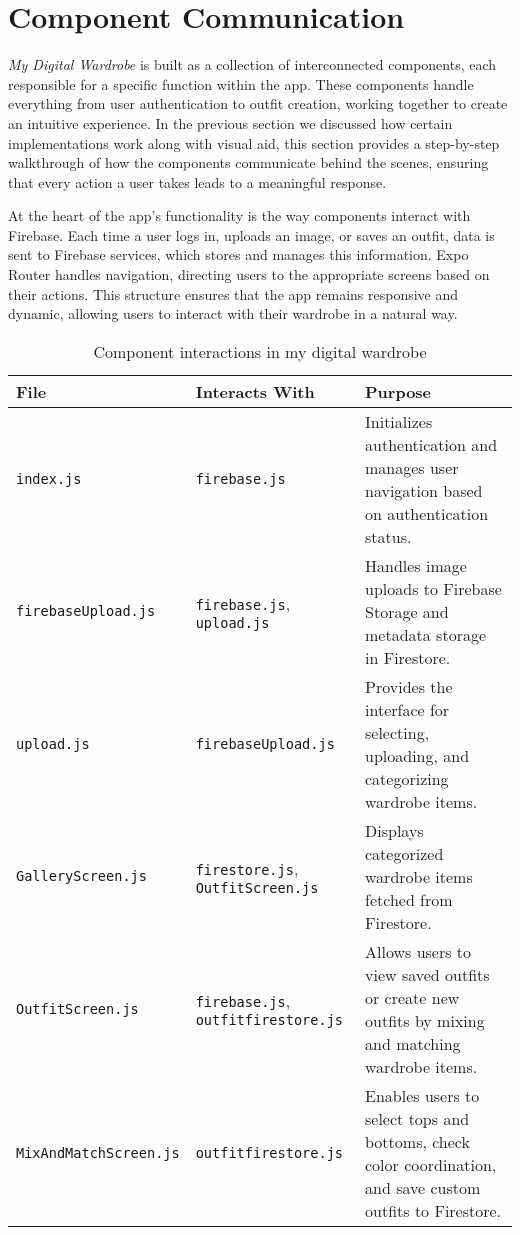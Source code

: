\section{Component Communication}

\textit{My Digital Wardrobe} is built as a collection of interconnected components, each responsible for a specific function within the app. These components handle everything from user authentication to outfit creation, working together to create an intuitive experience. In the previous section we discussed how  certain implementations work along with visual aid, this section provides a step-by-step walkthrough of how the components communicate behind the scenes, ensuring that every action a user takes leads to a meaningful response.

At the heart of the app’s functionality is the way components interact with Firebase. Each time a user logs in, uploads an image, or saves an outfit, data is sent to Firebase services, which stores and manages this information. Expo Router handles navigation, directing users to the appropriate screens based on their actions. This structure ensures that the app remains responsive and dynamic, allowing users to interact with their wardrobe in a natural way.

\begin{table}[h]
    \centering
    \begin{tabular}{|l|l|p{5cm}|}
        \hline
        \textbf{File} & \textbf{Interacts With} & \textbf{Purpose} \\
        \hline
        \texttt{index.js} & \texttt{firebase.js} & Initializes authentication and manages user navigation based on authentication status. \\
        \hline
        \texttt{firebaseUpload.js} & \texttt{firebase.js}, \texttt{upload.js} & Handles image uploads to Firebase Storage and metadata storage in Firestore. \\
        \hline
        \texttt{upload.js} & \texttt{firebaseUpload.js} & Provides the interface for selecting, uploading, and categorizing wardrobe items. \\
        \hline
        \texttt{GalleryScreen.js} & \texttt{firestore.js}, \texttt{OutfitScreen.js} & Displays categorized wardrobe items fetched from Firestore. \\
        \hline
        \texttt{OutfitScreen.js} & \texttt{firebase.js}, \texttt{outfitfirestore.js} & Allows users to view saved outfits or create new outfits by mixing and matching wardrobe items. \\
        \hline
        \texttt{MixAndMatchScreen.js} & \texttt{outfitfirestore.js} & Enables users to select tops and bottoms, check color coordination, and save custom outfits to Firestore. \\
        \hline
    \end{tabular}
    \caption{Component interactions in my digital wardrobe}
    \label{tab:component_communication}
\end{table}

